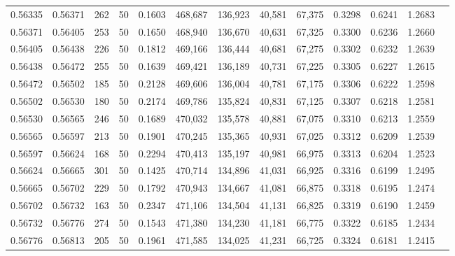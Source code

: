 \begin{tabular}{rrrrrrrrrrrrr}
0.56335 & 0.56371 &   262 &  50 &                                     0.1603 & 468,687 & 136,923 &  40,581 &  67,375 & 0.3298 & 0.6241 & 1.2683 \\
0.56371 & 0.56405 &   253 &  50 &                                     0.1650 & 468,940 & 136,670 &  40,631 &  67,325 & 0.3300 & 0.6236 & 1.2660 \\
0.56405 & 0.56438 &   226 &  50 &                                     0.1812 & 469,166 & 136,444 &  40,681 &  67,275 & 0.3302 & 0.6232 & 1.2639 \\
0.56438 & 0.56472 &   255 &  50 &                                     0.1639 & 469,421 & 136,189 &  40,731 &  67,225 & 0.3305 & 0.6227 & 1.2615 \\
0.56472 & 0.56502 &   185 &  50 &                                     0.2128 & 469,606 & 136,004 &  40,781 &  67,175 & 0.3306 & 0.6222 & 1.2598 \\
0.56502 & 0.56530 &   180 &  50 &                                     0.2174 & 469,786 & 135,824 &  40,831 &  67,125 & 0.3307 & 0.6218 & 1.2581 \\
0.56530 & 0.56565 &   246 &  50 &                                     0.1689 & 470,032 & 135,578 &  40,881 &  67,075 & 0.3310 & 0.6213 & 1.2559 \\
0.56565 & 0.56597 &   213 &  50 &                                     0.1901 & 470,245 & 135,365 &  40,931 &  67,025 & 0.3312 & 0.6209 & 1.2539 \\
0.56597 & 0.56624 &   168 &  50 &                                     0.2294 & 470,413 & 135,197 &  40,981 &  66,975 & 0.3313 & 0.6204 & 1.2523 \\
0.56624 & 0.56665 &   301 &  50 &                                     0.1425 & 470,714 & 134,896 &  41,031 &  66,925 & 0.3316 & 0.6199 & 1.2495 \\
0.56665 & 0.56702 &   229 &  50 &                                     0.1792 & 470,943 & 134,667 &  41,081 &  66,875 & 0.3318 & 0.6195 & 1.2474 \\
0.56702 & 0.56732 &   163 &  50 &                                     0.2347 & 471,106 & 134,504 &  41,131 &  66,825 & 0.3319 & 0.6190 & 1.2459 \\
0.56732 & 0.56776 &   274 &  50 &                                     0.1543 & 471,380 & 134,230 &  41,181 &  66,775 & 0.3322 & 0.6185 & 1.2434 \\
0.56776 & 0.56813 &   205 &  50 &                                     0.1961 & 471,585 & 134,025 &  41,231 &  66,725 & 0.3324 & 0.6181 & 1.2415 \\

\end{tabular}
